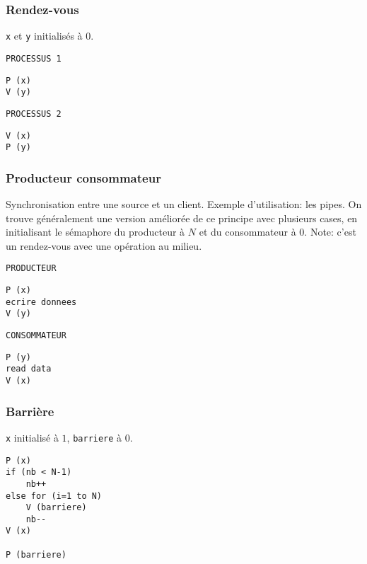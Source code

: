 \documentclass[9pt,a4paper,twocolumn]{article}
\begin{document}
    \subsubsection{Rendez-vous}

    \texttt{x} et \texttt{y} initialisés à $0$.

    \begin{multicols}{2}
        \texttt{PROCESSUS 1}
        \begin{lstlisting}
P (x)
V (y)
        \end{lstlisting}

        \columnbreak{}
        
        \texttt{PROCESSUS 2}
        \begin{lstlisting}
V (x)
P (y)
        \end{lstlisting}
    \end{multicols}

    \subsubsection{Producteur consommateur}

    Synchronisation entre une source et un client. Exemple d'utilisation: les pipes.
    On trouve généralement une version améliorée de ce principe avec plusieurs cases, en initialisant le sémaphore du producteur à $N$ et du consommateur à $0$.
    Note: c'est un rendez-vous avec une opération au milieu.

    \begin{multicols}{2}
        \texttt{PRODUCTEUR}
        \begin{lstlisting}
P (x) 
ecrire donnees
V (y)
        \end{lstlisting}
        \columnbreak{}
        \texttt{CONSOMMATEUR}
        \hspace{0cm}
        \begin{lstlisting}
P (y) 
read data
V (x) 
        \end{lstlisting}
    \end{multicols}


    \subsubsection{Barrière}

    \texttt{x} initialisé à $1$, \texttt{barriere} à $0$.

    \begin{lstlisting}[frame=shadowbox]
P (x)
if (nb < N-1)
    nb++
else for (i=1 to N) 
    V (barriere)
    nb--
V (x)

P (barriere)
    \end{lstlisting}
\end{document}
